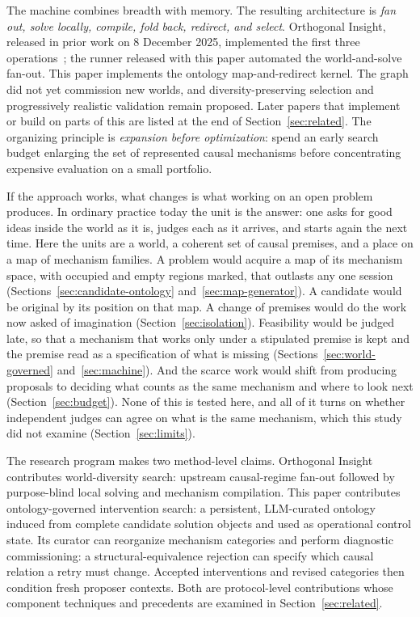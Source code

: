 \documentclass[11pt,a4paper]{article}
\begin{document}
The machine combines breadth with memory. The resulting architecture is \emph{fan out, solve locally, compile, fold back, redirect, and select}. Orthogonal Insight, released in prior work on 8 December 2025, implemented the first three operations~\cite{westerberg2025strangeworlds}; the runner released with this paper automated the world-and-solve fan-out. This paper implements the ontology map-and-redirect kernel. The graph did not yet commission new worlds, and diversity-preserving selection and progressively realistic validation remain proposed. Later papers that implement or build on parts of this are listed at the end of Section~\ref{sec:related}. The organizing principle is \emph{expansion before optimization}: spend an early search budget enlarging the set of represented causal mechanisms before concentrating expensive evaluation on a small portfolio.

If the approach works, what changes is what working on an open problem produces. In ordinary practice today the unit is the answer: one asks for good ideas inside the world as it is, judges each as it arrives, and starts again the next time. Here the units are a world, a coherent set of causal premises, and a place on a map of mechanism families. A problem would acquire a map of its mechanism space, with occupied and empty regions marked, that outlasts any one session (Sections~\ref{sec:candidate-ontology} and~\ref{sec:map-generator}). A candidate would be original by its position on that map. A change of premises would do the work now asked of imagination (Section~\ref{sec:isolation}). Feasibility would be judged late, so that a mechanism that works only under a stipulated premise is kept and the premise read as a specification of what is missing (Sections~\ref{sec:world-governed} and~\ref{sec:machine}). And the scarce work would shift from producing proposals to deciding what counts as the same mechanism and where to look next (Section~\ref{sec:budget}). None of this is tested here, and all of it turns on whether independent judges can agree on what is the same mechanism, which this study did not examine (Section~\ref{sec:limits}).

The research program makes two method-level claims. Orthogonal Insight contributes world-diversity search: upstream causal-regime fan-out followed by purpose-blind local solving and mechanism compilation. This paper contributes ontology-governed intervention search: a persistent, LLM-curated ontology induced from complete candidate solution objects and used as operational control state. Its curator can reorganize mechanism categories and perform diagnostic commissioning: a structural-equivalence rejection can specify which causal relation a retry must change. Accepted interventions and revised categories then condition fresh proposer contexts. Both are protocol-level contributions whose component techniques and precedents are examined in Section~\ref{sec:related}.
\end{document}
